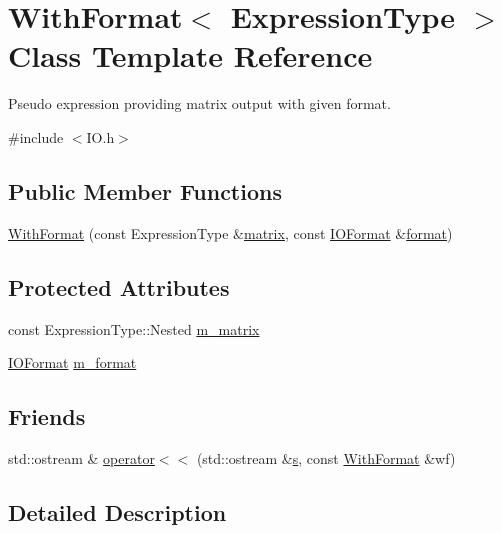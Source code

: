\hypertarget{class_with_format}{\section{With\-Format$<$ Expression\-Type $>$ Class Template Reference}
\label{class_with_format}
}


Pseudo expression providing matrix output with given format.  




{\ttfamily \#include $<$I\-O.\-h$>$}

\subsection*{Public Member Functions}
\begin{DoxyCompactItemize}
\item 
\hyperlink{class_with_format_a74194b1b3b7699fdc7d84b36209475ab}{With\-Format} (const Expression\-Type \&\hyperlink{glext_8h_a7b24a3f2f56eb1244ae69dacb4fecb6f}{matrix}, const \hyperlink{struct_i_o_format}{I\-O\-Format} \&\hyperlink{glext_8h_a86f086d889f7cdb4d6461497ae891265}{format})
\end{DoxyCompactItemize}
\subsection*{Protected Attributes}
\begin{DoxyCompactItemize}
\item 
const Expression\-Type\-::\-Nested \hyperlink{class_with_format_a681553408e4d3a78f97c8f480154ece7}{m\-\_\-matrix}
\item 
\hyperlink{struct_i_o_format}{I\-O\-Format} \hyperlink{class_with_format_a89301669e116d1596e30ceff8b4a2beb}{m\-\_\-format}
\end{DoxyCompactItemize}
\subsection*{Friends}
\begin{DoxyCompactItemize}
\item 
std\-::ostream \& \hyperlink{class_with_format_a817e230f591824ed812374d2da12f57b}{operator$<$$<$} (std\-::ostream \&\hyperlink{glext_8h_ad585a1393cfa368fa9dc3d8ebff640d5}{s}, const \hyperlink{class_with_format}{With\-Format} \&wf)
\end{DoxyCompactItemize}


\subsection{Detailed Description}
